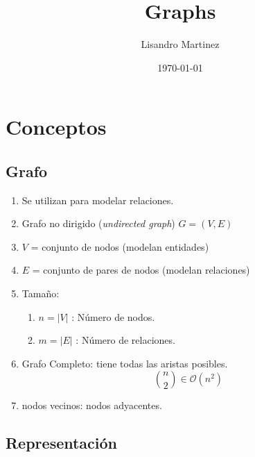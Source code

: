 \documentclass[12pt, fleqn]{article}
\title{Graphs}
\author{Lisandro Martinez}
\date{\today}
\begin{document}
    \maketitle
    \section{Conceptos}
        \subsection{Grafo}
            \begin{enumerate}
                \item Se utilizan para modelar relaciones.
                \item Grafo no dirigido (\emph{undirected graph}) $G = (V,E)$
                \item $V$ = conjunto de nodos (modelan entidades)
                \item $E$ = conjunto de pares de nodos (modelan relaciones)
                \item Tamaño:
                    \begin{enumerate}
                        \item $n = |V|$ : Número de nodos.
                        \item $m = |E|$ : Número de relaciones.
                    \end{enumerate}
                \item Grafo Completo: tiene todas las aristas posibles. \begin{displaymath}
                    {n \choose 2} \in \mathcal{O}(n^2)
                \end{displaymath}
                \item nodos vecinos: nodos adyacentes.
            \end{enumerate}
        \subsection{Representación}
\end{document}
